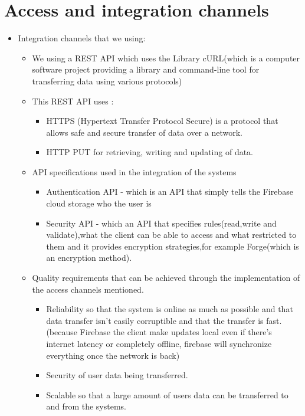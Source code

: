 \documentclass[a4paper,12pt]{article}
\begin{document}
\section{Access and integration channels}
\begin{itemize}
\item Integration channels that we using:
\begin{itemize}
\item We using a REST API which uses the Library cURL(which is a computer software project providing a library and command-line tool for transferring data using various protocols)

\item This REST API uses : 
\begin{itemize}
\item HTTPS (Hypertext Transfer Protocol Secure) is a protocol that allows safe and secure transfer of data over a network.
\item HTTP PUT for retrieving, writing and updating of data.
\end{itemize}

\item API specifications used in the integration of the systems
\begin{itemize}
\item Authentication API - which is an API that simply tells the Firebase cloud storage who the user is
\item Security API - which an API that specifies rules(read,write and validate),what the client can be able to access and what restricted to them and it provides encryption strategies,for example Forge(which is an encryption method).
\end{itemize}

\item Quality requirements that can be achieved through the implementation of the access channels mentioned.
\begin{itemize}
\item Reliability so that the system is online as much as possible and that data transfer isn’t easily corruptible and that the transfer is fast.(because Firebase the client make updates local even if there's internet latency or completely offline, firebase will synchronize everything once the network is back)

\item Security of user data being transferred.

\item Scalable so that a large amount of users data can be transferred to and from the systems.


\end{itemize}
\end{itemize}
\end{itemize}
\end{document}
